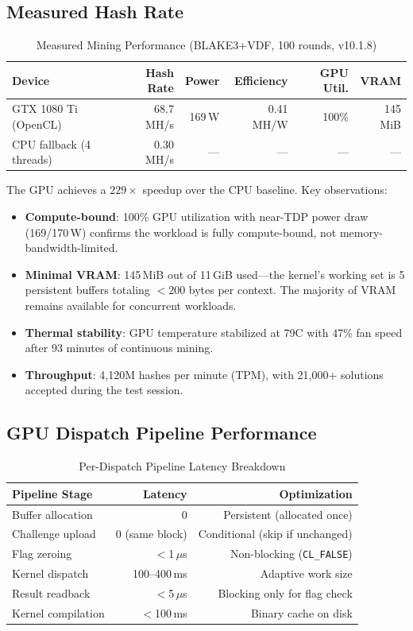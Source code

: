\documentclass[11pt,a4paper]{article}
\begin{document}
\subsection{Measured Hash Rate}

\begin{table}[H]
\centering
\begin{tabular}{|l|r|r|r|r|r|}
\hline
\textbf{Device} & \textbf{Hash Rate} & \textbf{Power} & \textbf{Efficiency} & \textbf{GPU Util.} & \textbf{VRAM} \\
\hline
GTX 1080 Ti (OpenCL) & 68.7 MH/s & 169\,W & 0.41 MH/W & 100\% & 145 MiB \\
CPU fallback (4 threads) & 0.30 MH/s & --- & --- & --- & --- \\
\hline
\end{tabular}
\caption{Measured Mining Performance (BLAKE3+VDF, 100 rounds, v10.1.8)}
\end{table}

The GPU achieves a $229\times$ speedup over the CPU baseline. Key observations:
\begin{itemize}
    \item \textbf{Compute-bound}: 100\% GPU utilization with near-TDP power draw (169/170\,W) confirms the workload is fully compute-bound, not memory-bandwidth-limited.
    \item \textbf{Minimal VRAM}: 145\,MiB out of 11\,GiB used---the kernel's working set is 5 persistent buffers totaling $<$200 bytes per context. The majority of VRAM remains available for concurrent workloads.
    \item \textbf{Thermal stability}: GPU temperature stabilized at 79\textdegree C with 47\% fan speed after 93 minutes of continuous mining.
    \item \textbf{Throughput}: 4,120M hashes per minute (TPM), with 21,000+ solutions accepted during the test session.
\end{itemize}

\subsection{GPU Dispatch Pipeline Performance}

\begin{table}[H]
\centering
\begin{tabular}{|l|r|r|}
\hline
\textbf{Pipeline Stage} & \textbf{Latency} & \textbf{Optimization} \\
\hline
Buffer allocation & 0 & Persistent (allocated once) \\
Challenge upload & 0 (same block) & Conditional (skip if unchanged) \\
Flag zeroing & $<$1\,$\mu$s & Non-blocking (\texttt{CL\_FALSE}) \\
Kernel dispatch & 100--400\,ms & Adaptive work size \\
Result readback & $<$5\,$\mu$s & Blocking only for flag check \\
Kernel compilation & $<$100\,ms & Binary cache on disk \\
\hline
\end{tabular}
\caption{Per-Dispatch Pipeline Latency Breakdown}
\end{table}
\end{document}
